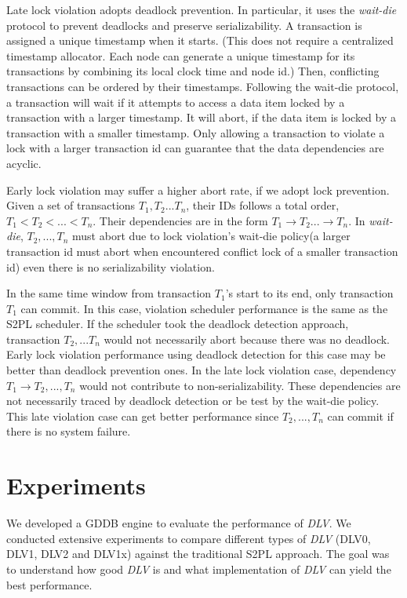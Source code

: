 \documentclass[conference]{IEEEtran}
\begin{document}
Late lock violation adopts deadlock prevention.
In particular, it uses the \emph{wait-die} protocol to prevent deadlocks and preserve serializability.
A transaction is assigned a unique timestamp when it starts.
(This does not require a centralized timestamp allocator.
Each node can generate a unique timestamp for its transactions by combining its local clock time and node id.)
Then, conflicting transactions can be ordered by their timestamps.
Following the wait-die protocol, a transaction will wait if it attempts to access a data item locked by a transaction with a larger timestamp.
It will abort, if the data item is locked by a transaction with a smaller timestamp.
Only allowing a transaction to violate a lock with a larger transaction id can guarantee that the data dependencies are acyclic.


Early lock violation may suffer a higher abort rate, if we adopt lock prevention.
Given a set of transactions ${T_1, T_2... T_n}$, their IDs follows a total order, ${T_1 < T_2 < ... < T_n}$.
Their dependencies are in the form ${T_1 \rightarrow T_2 ... \rightarrow T_n}$.
In \emph{wait-die}, ${T_2, ..., T_n}$ must abort due to lock violation's wait-die policy(a larger transaction id must abort when encountered conflict lock of a smaller transaction id) even there is no serializability violation.

In the same time window from transaction ${T_1}$'s start to its end, only transaction ${T_1}$ can commit.
In this case, violation scheduler performance is the same as the S2PL scheduler.
If the scheduler took the deadlock detection approach, transaction ${T_2, ... T_n}$ would not necessarily abort because there was no deadlock.
Early lock violation performance using deadlock detection for this case may be better than deadlock prevention ones.
In the late lock violation case, dependency ${T_1 \rightarrow T_2 , ... ,T_n}$ would not contribute to non-serializability.
These dependencies are not necessarily traced by deadlock detection or be test by the wait-die policy.
This late violation case can get better performance since ${T_2,..., T_n}$ can commit if there is no system failure.

\section{Experiments}
\label{sec:experiment}
We developed a GDDB engine to evaluate the performance of \emph{DLV}.
We conducted extensive experiments to compare different types of \emph{DLV} (DLV0, DLV1, DLV2 and DLV1x) against the traditional S2PL approach.
The goal was to understand how good \emph{DLV} is and what implementation of \emph{DLV} can yield the best performance. 
\end{document}
